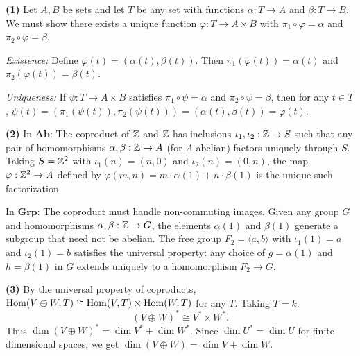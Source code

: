 \documentclass{report}
\begin{document}
\begin{solution}
\textbf{(1)} Let \(A, B\) be sets and let \(T\) be any set with functions \(\alpha : T \to A\) and \(\beta : T \to B\). We must show there exists a unique function \(\varphi : T \to A \times B\) with \(\pi_1 \circ \varphi = \alpha\) and \(\pi_2 \circ \varphi = \beta\).

\emph{Existence:} Define \(\varphi(t) = (\alpha(t), \beta(t))\). Then \(\pi_1(\varphi(t)) = \alpha(t)\) and \(\pi_2(\varphi(t)) = \beta(t)\).

\emph{Uniqueness:} If \(\psi : T \to A \times B\) satisfies \(\pi_1 \circ \psi = \alpha\) and \(\pi_2 \circ \psi = \beta\), then for any \(t \in T\), \(\psi(t) = (\pi_1(\psi(t)), \pi_2(\psi(t))) = (\alpha(t), \beta(t)) = \varphi(t)\).

\textbf{(2)} In \(\mathbf{Ab}\): The coproduct of \(\ZZ\) and \(\ZZ\) has inclusions \(\iota_1, \iota_2 : \ZZ \to S\) such that any pair of homomorphisms \(\alpha, \beta : \ZZ \to A\) (for \(A\) abelian) factors uniquely through \(S\). Taking \(S = \ZZ^2\) with \(\iota_1(n) = (n, 0)\) and \(\iota_2(n) = (0, n)\), the map \(\varphi : \ZZ^2 \to A\) defined by \(\varphi(m, n) = m \cdot \alpha(1) + n \cdot \beta(1)\) is the unique such factorization.

In \(\mathbf{Grp}\): The coproduct must handle non-commuting images. Given any group \(G\) and homomorphisms \(\alpha, \beta : \ZZ \to G\), the elements \(\alpha(1)\) and \(\beta(1)\) generate a subgroup that need not be abelian. The free group \(F_2 = \langle a, b \rangle\) with \(\iota_1(1) = a\) and \(\iota_2(1) = b\) satisfies the universal property: any choice of \(g = \alpha(1)\) and \(h = \beta(1)\) in \(G\) extends uniquely to a homomorphism \(F_2 \to G\).

\textbf{(3)} By the universal property of coproducts, \(\operatorname{Hom}(V \oplus W, T) \cong \operatorname{Hom}(V, T) \times \operatorname{Hom}(W, T)\) for any \(T\). Taking \(T = k\):
\[(V \oplus W)^* \cong V^* \times W^*.\]
Thus \(\dim(V \oplus W)^* = \dim V^* + \dim W^*\). Since \(\dim U^* = \dim U\) for finite-dimensional spaces, we get \(\dim(V \oplus W) = \dim V + \dim W\).
\end{solution}

\end{document}
